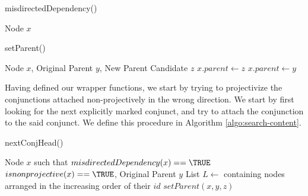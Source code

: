 \begin{algorithm}[H]
\caption{misdirectedDependency()}
\label{misdirected-edges-algo}
    \begin{algorithmic}[1]
    \REQUIRE Node $x$
        \RETURN \TRUE
    \ENDIF
    \RETURN \FALSE
    \end{algorithmic}
\end{algorithm}

\begin{algorithm}[H]
\caption{setParent()}
\label{rollback-algo}
    \begin{algorithmic}[1]
    \REQUIRE Node $x$, Original Parent $y$, New Parent Candidate $z$
    \STATE $x.parent \leftarrow z$
        \STATE $x.parent \leftarrow y$
        \RETURN \FALSE
    \ELSE
        \RETURN \TRUE
    \ENDIF
    \end{algorithmic}
\end{algorithm}

Having defined our wrapper functions, we start by trying to projectivize the conjunctions attached non-projectively in the wrong direction. We start by first looking for the next explicitly marked conjunct, and try to attach the conjunction to the said conjunct. We define this procedure in Algorithm \ref{algo:search-content}.

\begin{algorithm}[H]
\caption{nextConjHead()}
\label{algo:search-content}
    \begin{algorithmic}[1]
    \REQUIRE Node $x$ such that  $misdirectedDependency(x) == \TRUE$ \AND $isnonprojective(x) == \TRUE$, Original Parent $y$
    \STATE List $L \leftarrow$ containing nodes arranged in the increasing order of their $id$
    \STATE {}
    \STATE {}
                \RETURN $setParent(x, y, z)$
            \ENDIF
        \ENDIF
    \ENDFOR
    \RETURN \FALSE
    \end{algorithmic}
\end{algorithm}

